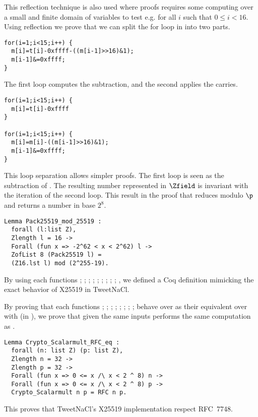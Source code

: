 This reflection technique is also used where proofs requires some computing
over a small and finite domain of variables to test e.g. for all $i$ such that
$0 \le i < 16$.
Using reflection we prove that we can split the for loop in 
into two parts.
\begin{lstlisting}[language=Ctweetnacl]
for(i=1;i<15;i++) {
  m[i]=t[i]-0xffff-((m[i-1]>>16)&1);
  m[i-1]&=0xffff;
}
\end{lstlisting}
The first loop computes the subtraction, and the second applies the carries.
\begin{lstlisting}[language=Ctweetnacl]
for(i=1;i<15;i++) {
  m[i]=t[i]-0xffff
}

for(i=1;i<15;i++) {
  m[i]=m[i]-((m[i-1]>>16)&1);
  m[i-1]&=0xffff;
}
\end{lstlisting}

This loop separation allows simpler proofs. The first loop is seen as the
subtraction of \p. The resulting number represented in $\Zfield$ is invariant with
the iteration of the second loop. This result in the proof that 
reduces modulo $\p$ and returns a number in base $2^8$.
\begin{lstlisting}[language=Coq]
Lemma Pack25519_mod_25519 :
  forall (l:list Z),
  Zlength l = 16 ->
  Forall (fun x => -2^62 < x < 2^62) l ->
  ZofList 8 (Pack25519 l) =
  (Z16.lst l) mod (2^255-19).
\end{lstlisting}

By using each functions ; ; ; ;
; ; ; ; ; ,
we defined a Coq definition  mimicking the exact behavior of X25519 in TweetNaCl.

By proving that each functions ; ; ; ;
; ; ; ;  behave over 
as their equivalent over  with  (in \Zfield), we prove that given the same inputs  performs the same computation as .
\begin{lstlisting}[language=Coq]
Lemma Crypto_Scalarmult_RFC_eq :
  forall (n: list Z) (p: list Z),
  Zlength n = 32 ->
  Zlength p = 32 ->
  Forall (fun x => 0 <= x /\ x < 2 ^ 8) n ->
  Forall (fun x => 0 <= x /\ x < 2 ^ 8) p ->
  Crypto_Scalarmult n p = RFC n p.
\end{lstlisting}

This proves that TweetNaCl's X25519 implementation respect RFC~7748.
